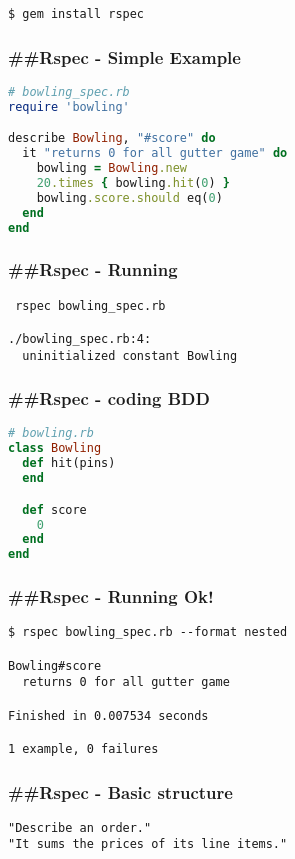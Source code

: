 \documentclass[serif,mathserif]{article}
\begin{document}
\begin{verbatim}
$ gem install rspec
\end{verbatim}

\subsubsection{\#\#Rspec - Simple Example}
\begin{lstlisting}[language=ruby]
# bowling_spec.rb
require 'bowling'

describe Bowling, "#score" do
  it "returns 0 for all gutter game" do
    bowling = Bowling.new
    20.times { bowling.hit(0) }
    bowling.score.should eq(0)
  end
end
\end{lstlisting}

\subsubsection{\#\#Rspec - Running}
\begin{verbatim}
 rspec bowling_spec.rb

./bowling_spec.rb:4:
  uninitialized constant Bowling
\end{verbatim}


\subsubsection{\#\#Rspec - coding BDD}
\begin{lstlisting}[language=ruby]
# bowling.rb
class Bowling
  def hit(pins)
  end

  def score
    0
  end
end
\end{lstlisting}

\subsubsection{\#\#Rspec - Running Ok!}
\begin{verbatim}
$ rspec bowling_spec.rb --format nested

Bowling#score
  returns 0 for all gutter game

Finished in 0.007534 seconds

1 example, 0 failures
\end{verbatim}

\subsubsection{\#\#Rspec - Basic structure}
\begin{verbatim}
"Describe an order."
"It sums the prices of its line items."
\end{verbatim}
\end{document}

